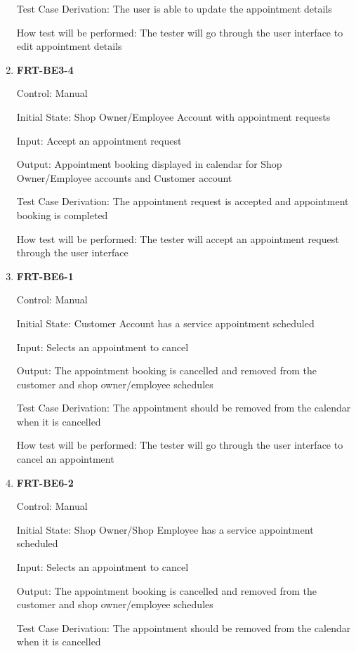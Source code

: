\documentclass[12pt, titlepage]{article}
\begin{document}
\begin{enumerate}
	      Test Case Derivation: The user is able to update the appointment details

	      How test will be performed: The tester will go through the user interface to edit appointment
	      details

	\item \textbf{FRT-BE3-4}

	      Control: Manual

	      Initial State: Shop Owner/Employee Account with appointment requests

	      Input: Accept an appointment request

	      Output: Appointment booking displayed in calendar for Shop Owner/Employee accounts and Customer
	      account

	      Test Case Derivation: The appointment request is accepted and appointment booking is completed

	      How test will be performed: The tester will accept an appointment request through the user
	      interface

	\item \textbf{FRT-BE6-1}

	      Control: Manual

	      Initial State: Customer Account has a service appointment scheduled

	      Input: Selects an appointment to cancel

	      Output: The appointment booking is cancelled and removed from the customer and shop owner/employee
	      schedules

	      Test Case Derivation: The appointment should be removed from the calendar when it is cancelled

	      How test will be performed: The tester will go through the user interface to cancel an appointment

	\item \textbf{FRT-BE6-2}

	      Control: Manual

	      Initial State: Shop Owner/Shop Employee has a service appointment scheduled

	      Input: Selects an appointment to cancel

	      Output: The appointment booking is cancelled and removed from the customer and shop owner/employee
	      schedules

	      Test Case Derivation: The appointment should be removed from the calendar when it is cancelled


\end{enumerate}
\end{document}
